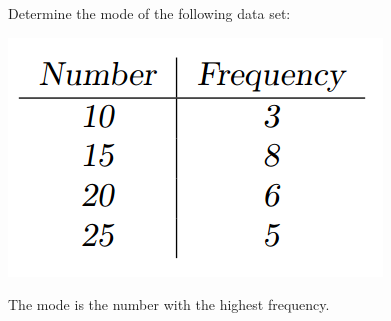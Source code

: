 \documentclass{ximera}
\begin{document}
\begin{question}
Determine the mode of the following data set:
\begin{image}
\includegraphics{StatsTable2.png}
\end{image}

    \begin{hint}
      The mode is the number with the highest frequency.
    \end{hint}
    \begin{multipleChoice}
    \end{multipleChoice}

\end{question}
\end{document}
